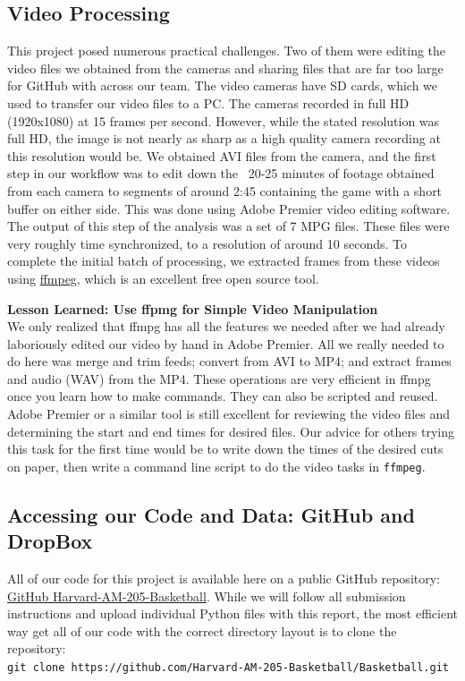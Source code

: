 \documentclass{article}
\begin{document}
\subsection{Video Processing}
This project posed numerous practical challenges.  
Two of them were editing the video files we obtained from the cameras 
and sharing files that are far too large for GitHub with across our team.
The video cameras have SD cards, which we used to transfer our video files to a PC.
The cameras recorded in full HD (1920x1080) at 15 frames per second.
However, while the stated resolution was full HD, the image is not nearly as sharp
as a high quality camera recording at this resolution would be.
We obtained AVI files from the camera, and the first step in our workflow was to 
edit down the ~20-25 minutes of footage obtained from each camera to segments
of around 2:45 containing the game with a short buffer on either side. 
This was done using Adobe Premier video editing software.
The output of this step of the analysis was a set of 7 MPG files.
These files were very roughly time synchronized, to a resolution of around 10 seconds.
To complete the initial batch of processing, we extracted frames from these videos
using \href{https://www.ffmpeg.org/}{ffmpeg}, which is an excellent free open source tool.

\textbf{Lesson Learned: Use ffpmg for Simple Video Manipulation}\\
We only realized that ffmpg has all the features we needed after we had already laboriously
edited our video by hand in Adobe Premier.  
All we really needed to do here was merge and trim feeds; convert from AVI to MP4;
and extract frames and audio (WAV) from the MP4.
These operations are very efficient in ffmpg once you learn how to make commands.
They can also be scripted and reused.  
Adobe Premier or a similar tool is still excellent for reviewing the video files and determining
the start and end times for desired files.  
Our advice for others trying this task for the first time would be to write down the times of the
desired cuts on paper, then write a command line script to do the video tasks in \texttt{ffmpeg}.

\newpage
\subsection{Accessing our Code and Data: GitHub and DropBox}
All of our code for this project is available here on a public GitHub repository:\\
\href{https://github.com/Harvard-AM-205-Basketball/Basketball}{GitHub Harvard-AM-205-Basketball}.
While we will follow all submission instructions and upload individual Python files with this report,
the most efficient way get all of our code with the correct directory layout is to clone the repository: \\
\texttt{git clone https://github.com/Harvard-AM-205-Basketball/Basketball.git}
\end{document}
